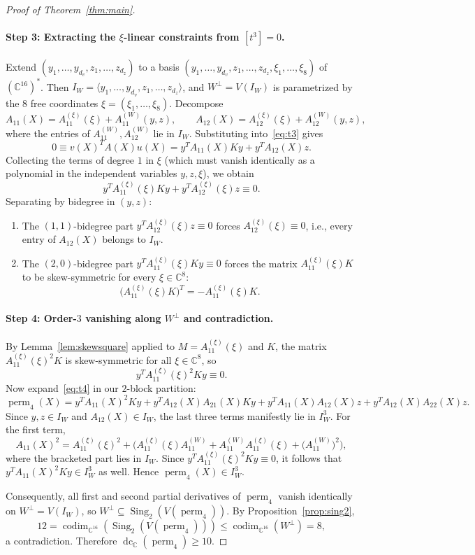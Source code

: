 \documentclass[11pt,a4paper]{article}
\theoremstyle{definition}
\DeclareMathOperator{\perm}{perm}
\DeclareMathOperator{\dc}{dc}
\DeclareMathOperator{\codim}{codim}
\DeclareMathOperator{\Sing}{Sing}
\begin{document}
\begin{proof}[Proof of Theorem~\ref{thm:main}]
\paragraph{Step 3: Extracting the $\xi$-linear constraints from $[t^3] = 0$.}
Extend $(y_1,\dots,y_{d_v}, z_1,\dots,z_{d_z})$ to a basis $(y_1,\dots,y_{d_v}, z_1,\dots,z_{d_z}, \xi_1,\dots,\xi_8)$ of $(\mathbb{C}^{16})^*$. Then $I_W = \langle y_1,\dots,y_{d_v}, z_1,\dots,z_{d_z} \rangle$, and $W^\perp = V(I_W)$ is parametrized by the $8$ free coordinates $\xi = (\xi_1,\dots,\xi_8)$. Decompose
\[
  A_{11}(X) = A_{11}^{(\xi)}(\xi) + A_{11}^{(W)}(y,z), \qquad
  A_{12}(X) = A_{12}^{(\xi)}(\xi) + A_{12}^{(W)}(y,z),
\]
where the entries of $A_{11}^{(W)}, A_{12}^{(W)}$ lie in $I_W$. Substituting into~\eqref{eq:t3} gives
\[
  0 \equiv v(X)^T A(X) u(X) = y^T A_{11}(X) K y + y^T A_{12}(X) z.
\]
Collecting the terms of degree $1$ in $\xi$ (which must vanish identically as a polynomial in the independent variables $y, z, \xi$), we obtain
\[
  y^T A_{11}^{(\xi)}(\xi) K y + y^T A_{12}^{(\xi)}(\xi) z \equiv 0.
\]
Separating by bidegree in $(y, z)$:
\begin{enumerate}
  \item The $(1,1)$-bidegree part $y^T A_{12}^{(\xi)}(\xi) z \equiv 0$ forces $A_{12}^{(\xi)}(\xi) \equiv 0$, i.e., every entry of $A_{12}(X)$ belongs to $I_W$.
  \item The $(2,0)$-bidegree part $y^T A_{11}^{(\xi)}(\xi) K y \equiv 0$ forces the matrix $A_{11}^{(\xi)}(\xi) K$ to be skew-symmetric for every $\xi \in \mathbb{C}^8$:
  \[
    \big(A_{11}^{(\xi)}(\xi) K\big)^T = -A_{11}^{(\xi)}(\xi) K.
  \]
\end{enumerate}

\paragraph{Step 4: Order-$3$ vanishing along $W^\perp$ and contradiction.}
By Lemma~\ref{lem:skewsquare} applied to $M = A_{11}^{(\xi)}(\xi)$ and $K$, the matrix $A_{11}^{(\xi)}(\xi)^2 K$ is skew-symmetric for all $\xi \in \mathbb{C}^8$, so
\[
  y^T A_{11}^{(\xi)}(\xi)^2 K y \equiv 0.
\]
Now expand~\eqref{eq:t4} in our $2$-block partition:
\[
  \perm_4(X) = y^T A_{11}(X)^2 K y + y^T A_{12}(X) A_{21}(X) K y + y^T A_{11}(X) A_{12}(X) z + y^T A_{12}(X) A_{22}(X) z.
\]
Since $y, z \in I_W$ and $A_{12}(X) \in I_W$, the last three terms manifestly lie in $I_W^3$. For the first term,
\[
  A_{11}(X)^2 = A_{11}^{(\xi)}(\xi)^2 + \Big(A_{11}^{(\xi)}(\xi) A_{11}^{(W)} + A_{11}^{(W)} A_{11}^{(\xi)}(\xi) + \big(A_{11}^{(W)}\big)^2\Big),
\]
where the bracketed part lies in $I_W$. Since $y^T A_{11}^{(\xi)}(\xi)^2 K y \equiv 0$, it follows that $y^T A_{11}(X)^2 K y \in I_W^3$ as well. Hence $\perm_4(X) \in I_W^3$.

Consequently, all first and second partial derivatives of $\perm_4$ vanish identically on $W^\perp = V(I_W)$, so $W^\perp \subseteq \Sing_2(V(\perm_4))$. By Proposition~\ref{prop:sing2},
\[
  12 = \codim_{\mathbb{C}^{16}}(\Sing_2(V(\perm_4))) \le \codim_{\mathbb{C}^{16}}(W^\perp) = 8,
\]
a contradiction. Therefore $\dc_{\mathbb{C}}(\perm_4) \ge 10$.
\end{proof}
\end{document}
